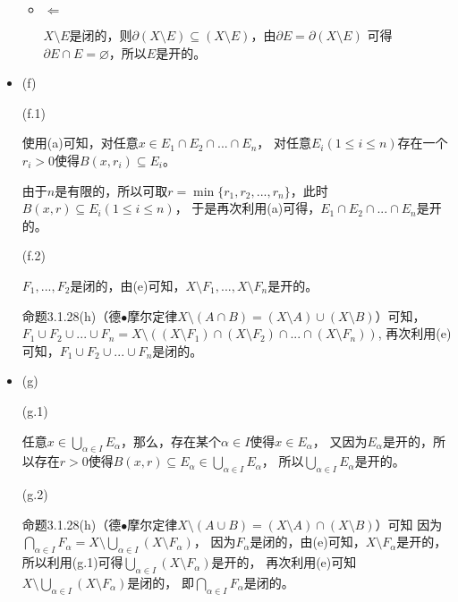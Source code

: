 \documentclass{article}
\begin{document}
\begin{itemize}
\begin{itemize}
                  \item $\Leftarrow$

                        $X \setminus E$是闭的，则$\partial (X \setminus E) \subseteq (X \setminus E)$，由$\partial E = \partial (X \setminus E)$
                        可得$\partial E \cap E = \varnothing$，所以$E$是开的。
            \end{itemize}

      \item (f)

            (f.1)

            使用(a)可知，对任意$x \in E_1 \cap E_2 \cap ... \cap E_n$，
            对任意$E_i (1 \leq i \leq n)$存在一个$r_i > 0$使得$B(x, r_i) \subseteq E_i$。

            由于$n$是有限的，所以可取$r = \min\{r_1, r_2, ..., r_n\}$，此时$B(x, r) \subseteq E_i(1 \leq i \leq n)$，
            于是再次利用(a)可得，$E_1 \cap E_2 \cap ... \cap E_n$是开的。

            (f.2)

            $F_1,...,F_2$是闭的，由(e)可知，$X \setminus F_1,...,X \setminus F_n$是开的。

            命题3.1.28(h)（德$\bullet$摩尔定律$X \setminus (A \cap B) = (X \setminus A) \cup (X \setminus B)$）可知，
            $F_1 \cup F_2 \cup ... \cup F_n = X \setminus \left( (X \setminus F_1) \cap (X \setminus F_2)\cap ... \cap (X \setminus F_n) \right)$,
            再次利用(e)可知，$F_1 \cup F_2 \cup ... \cup F_n$是闭的。

      \item (g)

            (g.1)

            任意$x \in \bigcup_{\alpha \in I} E_{\alpha}$，那么，存在某个$\alpha \in I$使得$x \in E_{\alpha}$，
            又因为$E_{\alpha}$是开的，所以存在$r > 0$使得$B(x, r) \subseteq E_{\alpha} \in \bigcup_{\alpha \in I} E_{\alpha}$，
            所以$\bigcup_{\alpha \in I} E_{\alpha}$是开的。

            (g.2)

            命题3.1.28(h)（德$\bullet$摩尔定律$X \setminus (A \cup B) = (X \setminus A) \cap (X \setminus B)$）可知
            因为$\bigcap_{\alpha \in I} F_{\alpha} = X \setminus \bigcup_{\alpha \in I} (X \setminus F_{\alpha})$，
            因为$F_{\alpha}$是闭的，由(e)可知，$X \setminus F_{\alpha}$是开的，
            所以利用(g.1)可得$\bigcup_{\alpha \in I} (X \setminus F_{\alpha})$是开的，
            再次利用(e)可知$X \setminus \bigcup_{\alpha \in I} (X \setminus F_{\alpha})$是闭的，
            即$\bigcap_{\alpha \in I} F_{\alpha}$是闭的。



\end{itemize}
\end{document}
